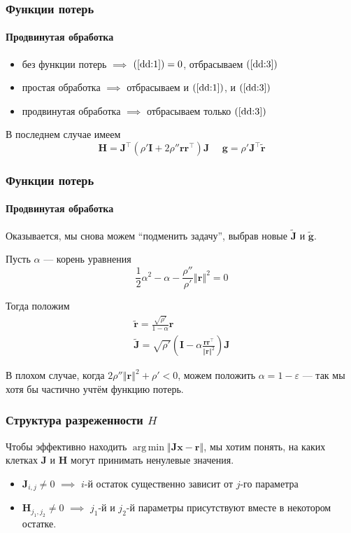 \documentclass[notheorems,aspectratio=169]{beamer}
\DeclareMathOperator*{\argmin}{arg\,min}
\begin{document}
\begin{frame}
  \frametitle{Функции потерь}
  \framesubtitle{Продвинутая обработка}
  \begin{itemize}
    \item без функции потерь $\implies$ $(\ref{dd:1})=0$, отбрасываем $(\ref{dd:3})$
    \item простая обработка $\implies$ отбрасываем и $(\ref{dd:1})$, и $(\ref{dd:3})$ 
    \item продвинутая обработка $\implies$ отбрасываем только $(\ref{dd:3})$
  \end{itemize}

  В последнем случае имеем
  $$\mathbf{H}=\mathbf{J}^\intercal\left(\rho'\mathbf{I}+2\rho''\mathbf{r}\mathbf{r}^\intercal\right)\mathbf{J} \,\,\,\,\,\,\,\, \mathbf{g}=\rho'\mathbf{J}^\intercal\tilde{\mathbf{r}}$$
\end{frame}

\begin{frame}
  \frametitle{Функции потерь}
  \framesubtitle{Продвинутая обработка}
  Оказывается, мы снова можем ``подменить задачу'', выбрав новые $\tilde{\mathbf{J}}$ и $\tilde{\mathbf{g}}$. 

  Пусть $\alpha$ --- корень уравнения 
  $$\frac{1}{2}\alpha^2-\alpha-\frac{\rho''}{\rho'}\left\Vert\mathbf{r}\right\Vert^2=0$$

  Тогда положим
  \begin{equation*}
    \begin{gathered}
      \tilde{\mathbf{r}}=\frac{\sqrt{\rho'}}{1-\alpha}\mathbf{r} \\
      \tilde{\mathbf{J}}=\sqrt{\rho'}\left(\mathbf{I}-\alpha\frac{\mathbf{r}\mathbf{r}^\intercal}{\left\Vert\mathbf{r}\right\Vert^2}\right)\mathbf{J}
    \end{gathered}
  \end{equation*}

  В плохом случае, когда $2\rho''\left\Vert\mathbf{r}\right\Vert^2+\rho'<0$, можем положить $\alpha=1-\varepsilon$ --- так мы хотя бы частично учтём функцию потерь.
\end{frame}

\begin{frame}
  \frametitle{Структура разреженности $H$}
  Чтобы эффективно находить $\argmin\left\Vert\mathbf{J}\mathbf{x}-\mathbf{r}\right\Vert$, мы хотим понять, на каких клетках $\mathbf{J}$ и $\mathbf{H}$ могут принимать ненулевые значения.
  \begin{itemize}
    \item $\mathbf{J}_{i,j}\neq 0$ $\implies$ $i$-й остаток существенно зависит от $j$-го параметра
    \item $\mathbf{H}_{j_1,j_2}\neq 0$ $\implies$ $j_1$-й и $j_2$-й параметры присутствуют вместе в некотором остатке.
 \end{itemize}
\end{frame}
\end{document}
